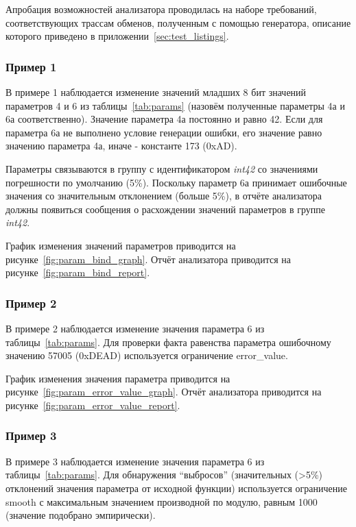Апробация возможностей анализатора проводилась на наборе требований, 
соответствующих трассам обменов, полученным с помощью генератора, описание 
которого приведено в приложении~\ref{sec:test_listings}.

\subsubsection{Пример 1}

В примере 1 наблюдается изменение значений младших 8 бит значений параметров 4 
и 6 из таблицы~\ref{tab:params} (назовём полученные параметры 4а и 6а 
соответственно). Значение параметра 4а 
постоянно и равно 42. Если для параметра 6а не выполнено условие генерации 
ошибки, его значение равно значению параметра 4а, иначе - константе 173 (0xAD). 

Параметры связываются в группу с идентификатором \textit{int42} со 
значениями погрешности по умолчанию (5\%). Поскольку параметр 6а принимает 
ошибочные значения со значительным отклонением (больше 5\%), в отчёте 
анализатора должны появиться сообщения о расхождении значений параметров в 
группе \textit{int42}.

График изменения значений параметров 
приводится на рисунке~\ref{fig:param_bind_graph}. Отчёт анализатора приводится 
на рисунке~\ref{fig:param_bind_report}.

\subsubsection{Пример 2}

В примере 2 наблюдается изменение значения параметра 6 из 
таблицы~\ref{tab:params}. Для проверки факта равенства параметра ошибочному 
значению 57005 (0xDEAD) используется ограничение error\_value.

График изменения значения параметра 
приводится на рисунке~\ref{fig:param_error_value_graph}. Отчёт анализатора 
приводится на рисунке~\ref{fig:param_error_value_report}.

\subsubsection{Пример 3}

В примере 3 наблюдается изменение значения параметра 6 из 
таблицы~\ref{tab:params}. Для обнаружения ``выбросов'' (значительных (>5\%)
отклонений значения параметра от исходной функции) используется ограничение 
smooth с максимальным значением производной по модулю, равным 1000 (значение 
подобрано эмпирически).

